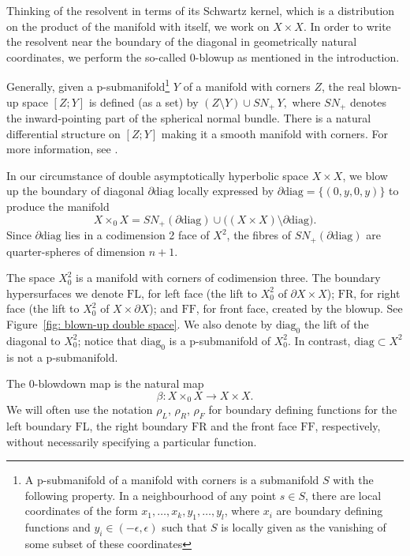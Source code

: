 \documentclass[10pt, a4paper, twoside]{amsart}
\numberwithin{equation}{section}
\theoremstyle{remark}
\begin{document}
Thinking of the resolvent in terms of its Schwartz kernel, which is a distribution on the product of the manifold with itself, we work on $X \times X$. In order to write the resolvent near the boundary of the diagonal in geometrically natural coordinates,  we perform the so-called $0$-blowup as mentioned in the introduction. 

Generally, given a p-submanifold\footnote{A p-submanifold of a manifold with corners is a submanifold $S$ with the following property. In a neighbourhood of any point $s \in S$, there are local coordinates of the form  $x_1, \dots, x_k, y_1, \dots, y_l$, where $x_i$ are boundary defining functions and $y_i \in (-\epsilon, \epsilon)$ such that $S$ is locally given as the vanishing of some subset of these coordinates} $Y$ of a manifold with corners $Z$, the real blown-up space $[Z; Y]$ is defined (as a set) by $(Z \setminus Y) \cup  SN_+\, Y,$ where $SN_+$ denotes the inward-pointing
part of the spherical normal bundle. There is a natural differential structure on $[Z;Y]$ making it a smooth manifold with corners. 
For more information, see \cite{DiffAnal}. 

In our circumstance of double asymptotically hyperbolic space $X \times X$, we blow up the boundary of diagonal $\partial \text{diag}$ locally expressed by $\partial \text{diag} = \{(0, y, 0, y)\}$ to produce the manifold $$X \times_0 X = SN_{+} (\partial \text{diag}) \cup \big((X \times X) \setminus \partial \text{diag}\big).$$ 
Since $\partial \text{diag}$ lies in a codimension 2 face of $X^2$, the fibres of $SN_+ (\partial \text{diag})$ are quarter-spheres of dimension $n+1$.  

The space $X^2_0$ is a manifold with corners of codimension three. The boundary hypersurfaces we denote ${\mathrm{FL}}$, for left face (the lift to $X^2_0$ of $\partial X \times X$); ${\mathrm{FR}}$, for right face (the lift to $X^2_0$ of $X \times \partial X$); and ${\mathrm{FF}}$, for front face, created by the blowup. See Figure~\ref{fig: blown-up double space}. We also denote by ${\mathrm{diag}_0}$ the lift of the diagonal to $X^2_0$; notice that ${\mathrm{diag}_0}$ is a p-submanifold of $X^2_0$. 
In contrast, $\text{diag} \subset X^2$  is not a p-submanifold. 

The $0$-blowdown map is the natural map $$\beta : X \times_0 X \longrightarrow X \times X.$$ We will often use the notation $\rho_L$, $\rho_R$, $\rho_F$ for boundary defining functions for the left boundary ${\mathrm{FL}}$, the right boundary ${\mathrm{FR}}$ and the front face ${\mathrm{FF}}$, respectively, without necessarily specifying a particular function. 
\end{document}
